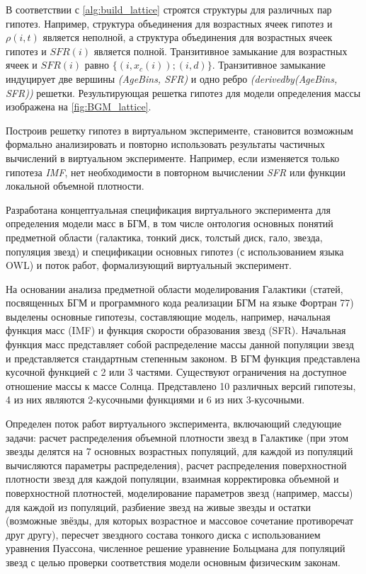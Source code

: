 В соответствии с \cref{alg:build_lattice} строятся структуры для различных пар гипотез. Например, структура 
объединения для возрастных ячеек гипотез и $\rho(i, t)$ является неполной, а структура объединения для возрастных 
ячеек гипотез и $SFR(i)$ является полной. Транзитивное замыкание для возрастных ячеек и $SFR(i)$ 
равно $\{(i, x_c(i)); (i, d)\}$. Транзитивное замыкание индуцирует две вершины \textit{(AgeBins, SFR)} 
и одно ребро \textit{(derived\textunderscore by(AgeBins, SFR))} решетки. Результирующая решетка гипотез 
для модели определения массы изображена на \cref{fig:BGM_lattice}.

Построив решетку гипотез в виртуальном эксперименте, становится возможным формально анализировать и повторно 
использовать результаты частичных вычислений в виртуальном эксперименте. Например, если изменяется только 
гипотеза \textit{IMF}, нет необходимости в повторном вычислении \textit{SFR} или функции локальной объемной плотности.

Разработана концептуальная спецификация виртуального эксперимента для определения модели масс в БГМ, в том 
числе онтология основных понятий предметной области (галактика, тонкий диск, толстый диск, гало, звезда, 
популяция звезд) и спецификации основных гипотез (с использованием языка OWL) и поток работ, формализующий 
виртуальный эксперимент.

На основании анализа предметной области моделирования Галактики (статей, посвященных БГМ и программного 
кода реализации БГМ на языке Фортран 77) выделены основные гипотезы, составляющие модель, например, 
начальная функция масс (IMF) и функция скорости образования звезд (SFR). Начальная функция масс представляет 
собой распределение массы данной популяции звезд и представляется стандартным степенным законом. 
В БГМ функция представлена кусочной функцией с 2 или 3 частями. Существуют ограничения на доступное 
отношение массы к массе Солнца. Представлено 10 различных версий гипотезы, 4 из них являются 2-кусочными 
функциями и 6 из них 3-кусочными.

Определен поток работ виртуального эксперимента, включающий следующие задачи: расчет распределения объемной 
плотности звезд в Галактике (при этом звезды делятся на 7 основных возрастных популяций, для каждой из 
популяций вычисляются параметры распределения), расчет распределения поверхностной плотности звезд для каждой 
популяции, взаимная корректировка объемной и поверхностной плотностей, моделирование параметров звезд 
(например, массы) для каждой из популяций, разбиение звезд на живые звезды и остатки (возможные звёзды, для 
которых возрастное и массовое сочетание противоречат друг другу), пересчет звездного состава тонкого диска с 
использованием уравнения Пуассона, численное решение уравнение Больцмана для популяций звезд с целью проверки 
соответствия модели основным физическим законам.

